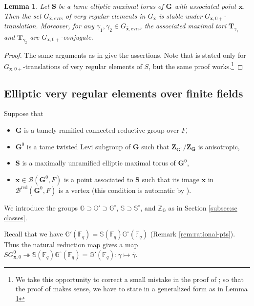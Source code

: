 \documentclass{amsart}
\newcommand{\evrs}{\mathrm{evrs}}
\newcommand{\red}{\mathrm{red}}
\newcommand{\bfT}{\mathbf{T}}
\newcommand{\x}{\mathbf{x}}
\newcommand{\F}{\mathbb{F}}
\newcommand{\bbS}{\mathbb{S}}
\newcommand{\bbG}{\mathbb{G}}
\newcommand{\bfG}{\mathbf{G}}
\newcommand{\bbZ}{\mathbb{Z}}
\newcommand{\bfS}{\mathbf{S}}
\newcommand{\bfZ}{\mathbf{Z}}
\newcommand{\mcB}{\mathcal{B}}
\theoremstyle{plain}
\newtheorem{lemma}[thm]{Lemma}
\theoremstyle{definition}
\theoremstyle{remark}
\theoremstyle{theorem}
\begin{document}
\begin{lemma}\label{lem:CO21-5.1-5.2}
Let $\bfS$ be a tame elliptic maximal torus of $\bfG$ with associated point $\x$.
Then the set $G_{\bar{\x},\evrs}$ of very regular elements in $G_{\bar{\x}}$ is stable under $G_{\x,0+}$-translation.
Moreover, for any $\gamma_{1},\gamma_{2}\in G_{\bar{\x},\evrs}$, the associated maximal tori $\bfT_{\gamma_{1}}$ and $\bfT_{\gamma_{2}}$ are $G_{\x,0+}$-conjugate.
\end{lemma}

\begin{proof}
The same arguments as in \cite[Lemma 5.1]{CO21} give the assertions.
Note that \cite[Lemma 5.1]{CO21} is stated only for $G_{\x,0+}$-translations of very regular elements of $S$, but the same proof works.\footnote{We take this opportunity to correct a small mistake in the proof of \cite[Lemma 5.2]{CO21}; so that the proof of \cite[Lemma 5.2]{CO21} makes sense, we have to state \cite[Lemma 5.2]{CO21} in a generalized form as in Lemma \ref{lem:CO21-5.1-5.2}}
\end{proof}



\subsection{Elliptic very regular elements over finite fields}\label{subsec:ur-vreg}

Suppose that
\begin{itemize}
\item
$\bfG$ is a tamely ramified connected reductive group over $F$,
\item
$\bfG^{0}$ is a tame twisted Levi subgroup of $\bfG$ such that $\bfZ_{\bfG^{0}}/\bfZ_{\bfG}$ is anisotropic, 
\item
$\bfS$ is a maximally unramified elliptic maximal torus of $\bfG^{0}$,
\item
$\x\in\mcB(\bfG^{0},F)$ is a point associated to $\bfS$ such that its image $\bar{\x}$ in $\mcB^{\red}(\bfG^{0},F)$ is a vertex (this condition is automatic by \cite[Lemma 3.4.3]{Kal19}).
\end{itemize}
We introduce the groups $\bbG\supset\bbG'\supset\bbG^{\circ}$, $\bbS\supset\bbS^{\circ}$, and $\bbZ_{\bbG}$ as in Section \ref{subsec:sc classes}.

Recall that we have $\bbG'(\F_{q})=\bbS(\F_{q})\bbG^{\circ}(\F_{q})$ (Remark \ref{rem:rational-pts}).
Thus the natural reduction map gives a map $SG^{0}_{\x,0}\twoheadrightarrow\bbS(\F_{q})\bbG^{\circ}(\F_{q})=\bbG'(\F_{q})\colon\gamma\mapsto\overline{\gamma}$.
\end{document}
